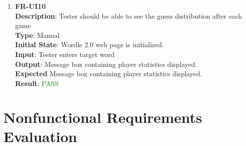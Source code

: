 \documentclass[12pt, titlepage]{article}
\begin{document}
\begin{enumerate}
	\item \textbf{FR-UI10\\}
	\textbf{Description}: Tester should be able to see the guess distribution after each game\\
	\textbf{Type}: Manual\\
	\textbf{Initial State}: Wordle 2.0 web page is initialized.\\
	\textbf{Input}: Tester enters target word\\
	\textbf{Output}: Message box containing player statistics displayed.\\
	\textbf{Expected} Message box containing player statistics displayed.\\
	\textbf{Result}: \textcolor{green}{PASS}\\
	
	
\end{enumerate}






\section{Nonfunctional Requirements Evaluation}
\end{document}
